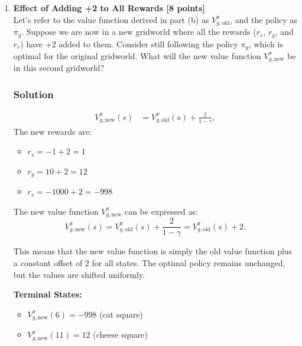 \documentclass{article}
\begin{document}
\begin{enumerate}[label=(\alph*)]

    \item \textbf{Effect of Adding +2 to All Rewards [8 points]} \\
    Let’s refer to the value function derived in part (b) as \( V^\pi_{g,\text{old}} \), and the policy as \( \pi_g \). Suppose we are now in a new gridworld where all the rewards (\( r_s \), \( r_g \), and \( r_r \)) have \( +2 \) added to them. Consider still following the policy \( \pi_g \), which is optimal for the original gridworld. What will the new value function \( V^\pi_{g,\text{new}} \) be in this second gridworld?
    \subsubsection*{Solution}
    \begin{align*}
    V^\pi_{g,\text{new}}(s) &= V^\pi_{g,\text{old}}(s) + \frac{2}{1 - \gamma},
    \end{align*}
    The new rewards are:
    \begin{itemize}
        \item \( r_s = -1 + 2 = 1 \)
        \item \( r_g = 10 + 2 = 12 \)
        \item \( r_r = -1000 + 2 = -998 \)
    \end{itemize}

    The new value function \( V^\pi_{g,\text{new}} \) can be expressed as:
    \[
    V^\pi_{g,\text{new}}(s) = V^\pi_{g,\text{old}}(s) + \frac{2}{1 - \gamma} = V^\pi_{g,\text{old}}(s) + 2.
    \]

    This means that the new value function is simply the old value function plus a constant offset of 2 for all states. The optimal policy remains unchanged, but the values are shifted uniformly.

    \textbf{Terminal States:}
    \begin{itemize}
        \item \( V^\pi_{g,\text{new}}(6) = -998 \) (cat square)
        \item \( V^\pi_{g,\text{new}}(11) = 12 \) (cheese square)
    \end{itemize}


\end{enumerate}
\end{document}
